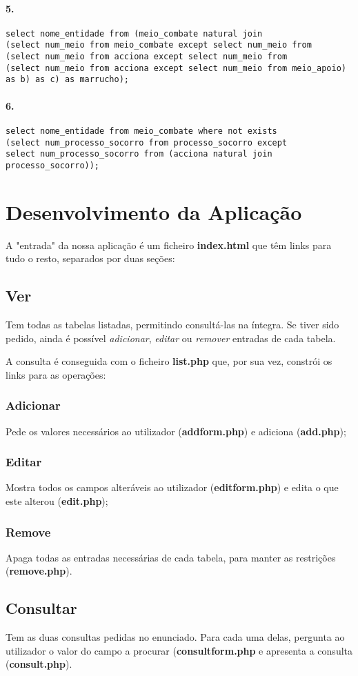 \documentclass[10pt,a4paper]{article}
\begin{document}
\paragraph{5.}
\begin{verbatim}
select nome_entidade from (meio_combate natural join 
(select num_meio from meio_combate except select num_meio from  
(select num_meio from acciona except select num_meio from 
(select num_meio from acciona except select num_meio from meio_apoio) as b) as c) as marrucho);
\end{verbatim}

\paragraph{6.}
\begin{verbatim}
select nome_entidade from meio_combate where not exists 
(select num_processo_socorro from processo_socorro except 
select num_processo_socorro from (acciona natural join processo_socorro));
\end{verbatim}

\section{Desenvolvimento da Aplicação}
A "entrada" da nossa aplicação é um ficheiro \textbf{index.html} que têm links para tudo o resto,
separados por duas seções:

\subsection{Ver}
Tem todas as tabelas listadas, permitindo consultá-las na íntegra.
Se tiver sido pedido, ainda é possível \textit{adicionar}, \textit{editar} ou \textit{remover}
entradas de cada tabela. 

A consulta é conseguida com o ficheiro \textbf{list.php} que, por sua vez, constrói os links
para as operações:

\subsubsection{Adicionar} Pede os valores necessários ao utilizador (\textbf{addform.php}) e adiciona (\textbf{add.php});
\subsubsection{Editar} Mostra todos os campos alteráveis ao utilizador (\textbf{editform.php}) e edita o que este alterou (\textbf{edit.php});
\subsubsection{Remove} Apaga todas as entradas necessárias de cada tabela, para manter as restrições (\textbf{remove.php}).

\subsection{Consultar}
Tem as duas consultas pedidas no enunciado. Para cada uma delas, pergunta ao utilizador o valor
do campo a procurar (\textbf{consultform.php} e apresenta a consulta (\textbf{consult.php}).
\end{document}

